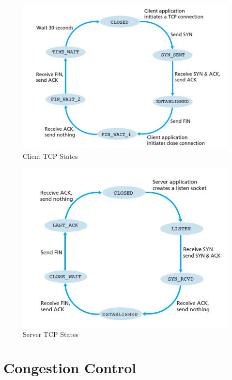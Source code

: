 \documentclass{article}
\theoremstyle{plain}
\theoremstyle{definition}
\begin{document}
\begin{figure}[!ht]
    \centering
    \includegraphics[scale=0.5]{cn6.png}
    \caption{Client TCP States}
\end{figure}

\begin{figure}[!ht]
    \centering
    \includegraphics[scale=0.5]{cn7.png}
    \caption{Server TCP States}
\end{figure}

\break

\section{Congestion Control}
\end{document}
